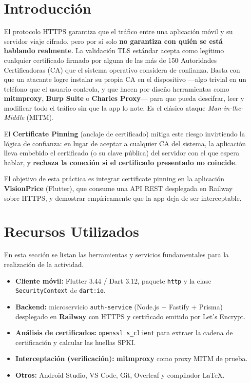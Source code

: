 \documentclass[12pt, a4paper]{article} %
\begin{document}

\section{Introducción}
\label{sec:introduccion}
El protocolo HTTPS garantiza que el tráfico entre una aplicación móvil y su
servidor viaje cifrado, pero por sí solo \textbf{no garantiza con quién se
está hablando realmente}. La validación TLS estándar acepta como legítimo
cualquier certificado firmado por alguna de las más de 150 Autoridades
Certificadoras (CA) que el sistema operativo considera de confianza. Basta con
que un atacante logre instalar su propia CA en el dispositivo —algo trivial en
un teléfono que el usuario controla, y que hacen por diseño herramientas como
\textbf{mitmproxy}, \textbf{Burp Suite} o \textbf{Charles Proxy}— para que
pueda descifrar, leer y modificar todo el tráfico sin que la app lo note. Es el
clásico ataque \textit{Man-in-the-Middle} (MITM).

El \textbf{Certificate Pinning} (anclaje de certificado) mitiga este riesgo
invirtiendo la lógica de confianza: en lugar de aceptar a cualquier CA del
sistema, la aplicación lleva embebido el certificado (o su clave pública) del
servidor con el que espera hablar, y \textbf{rechaza la conexión si el
certificado presentado no coincide}.

El objetivo de esta práctica es integrar certificate pinning en la aplicación
\textbf{VisionPrice} (Flutter), que consume una API REST desplegada en Railway
sobre HTTPS, y demostrar empíricamente que la app deja de ser interceptable.

\section{Recursos Utilizados}
\label{sec:recursos}
En esta sección se listan las herramientas y servicios fundamentales para la
realización de la actividad.

\begin{itemize}
    \item \textbf{Cliente móvil:} Flutter 3.44 / Dart 3.12, paquete
    \texttt{http} y la clase \texttt{SecurityContext} de \texttt{dart:io}.
    \item \textbf{Backend:} microservicio \texttt{auth-service}
    (Node.js + Fastify + Prisma) desplegado en \textbf{Railway} con HTTPS y
    certificado emitido por Let's Encrypt.
    \item \textbf{Análisis de certificados:} \texttt{openssl s\_client} para
    extraer la cadena de certificación y calcular las huellas SPKI.
    \item \textbf{Interceptación (verificación):} \textbf{mitmproxy} como
    proxy MITM de prueba.
    \item \textbf{Otros:} Android Studio, VS Code, Git, Overleaf y compilador
    \LaTeX{}.
\end{itemize}
\end{document}
